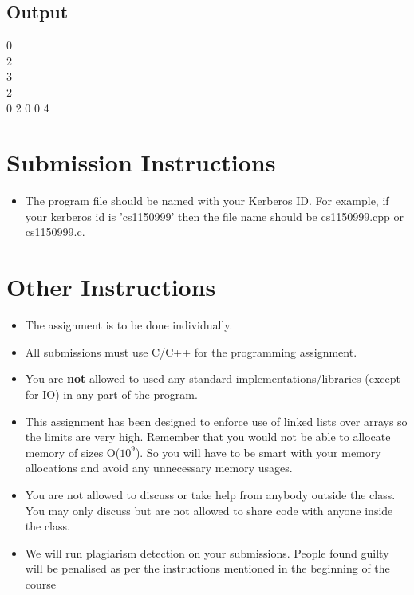 \documentclass[20pt]{article}
\begin{document}
\subsection{Output}
\-\hspace{10mm} 0\\
\-\hspace{10mm} 2\\
\-\hspace{10mm} 3\\
\-\hspace{10mm} 2\\
\-\hspace{10mm} 0 2 0 0 4\\

\section{Submission Instructions}
\begin{itemize}
\item The program file should be named with your Kerberos ID. For example, if your kerberos id is ’cs1150999’ then the file name should be cs1150999.cpp or cs1150999.c.
\end{itemize}

\section{Other Instructions}
\begin{itemize}
\item The assignment is to be done individually.
\item All submissions must use C/C++ for the programming assignment.
\item You are \textbf{not} allowed to used any standard implementations/libraries (except for IO) in any part of the program.
\item This assignment has been designed to enforce use of linked lists over arrays so the limits are very high. Remember that you would not be able to allocate memory of sizes O($10^9$). So you will have to be smart with your memory allocations and avoid any unnecessary memory usages.
\item You are not allowed to discuss or take help from anybody outside the class. You may only discuss but are not allowed to share code with anyone inside the class.
\item We will run plagiarism detection on your submissions. People found guilty will be penalised as per the instructions mentioned in the beginning of the course
\end{itemize}
\end{document}
